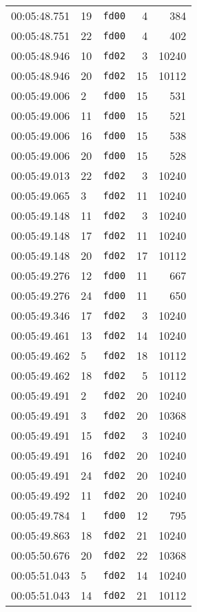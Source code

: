 \documentclass{article}
\begin{document}
\begin{longtable}{lllrr}
00:05:48.751 & 19 & \texttt{fd00} & 4 & 384 \\
00:05:48.751 & 22 & \texttt{fd00} & 4 & 402 \\
00:05:48.946 & 10 & \texttt{fd02} & 3 & 10240 \\
00:05:48.946 & 20 & \texttt{fd02} & 15 & 10112 \\
00:05:49.006 & 2 & \texttt{fd00} & 15 & 531 \\
00:05:49.006 & 11 & \texttt{fd00} & 15 & 521 \\
00:05:49.006 & 16 & \texttt{fd00} & 15 & 538 \\
00:05:49.006 & 20 & \texttt{fd00} & 15 & 528 \\
00:05:49.013 & 22 & \texttt{fd02} & 3 & 10240 \\
00:05:49.065 & 3 & \texttt{fd02} & 11 & 10240 \\
00:05:49.148 & 11 & \texttt{fd02} & 3 & 10240 \\
00:05:49.148 & 17 & \texttt{fd02} & 11 & 10240 \\
00:05:49.148 & 20 & \texttt{fd02} & 17 & 10112 \\
00:05:49.276 & 12 & \texttt{fd00} & 11 & 667 \\
00:05:49.276 & 24 & \texttt{fd00} & 11 & 650 \\
00:05:49.346 & 17 & \texttt{fd02} & 3 & 10240 \\
00:05:49.461 & 13 & \texttt{fd02} & 14 & 10240 \\
00:05:49.462 & 5 & \texttt{fd02} & 18 & 10112 \\
00:05:49.462 & 18 & \texttt{fd02} & 5 & 10112 \\
00:05:49.491 & 2 & \texttt{fd02} & 20 & 10240 \\
00:05:49.491 & 3 & \texttt{fd02} & 20 & 10368 \\
00:05:49.491 & 15 & \texttt{fd02} & 3 & 10240 \\
00:05:49.491 & 16 & \texttt{fd02} & 20 & 10240 \\
00:05:49.491 & 24 & \texttt{fd02} & 20 & 10240 \\
00:05:49.492 & 11 & \texttt{fd02} & 20 & 10240 \\
00:05:49.784 & 1 & \texttt{fd00} & 12 & 795 \\
00:05:49.863 & 18 & \texttt{fd02} & 21 & 10240 \\
00:05:50.676 & 20 & \texttt{fd02} & 22 & 10368 \\
00:05:51.043 & 5 & \texttt{fd02} & 14 & 10240 \\
00:05:51.043 & 14 & \texttt{fd02} & 21 & 10112 \\

\end{longtable}
\end{document}
